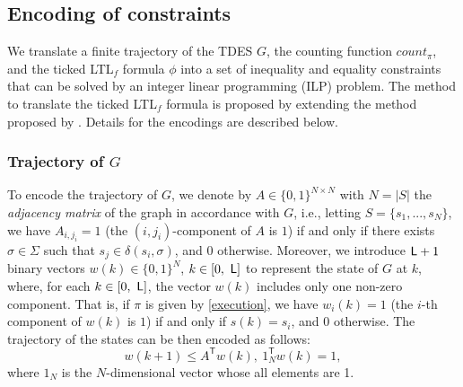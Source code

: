 \documentclass[journal,twoside,web]{IEEEtran}
\newcommand{\req}[1]{\eqref{#1}}
\newcommand{\Len}{{\sf L}}
\begin{document}
\subsection{Encoding of constraints}\label{encode}
%
We translate a finite trajectory of the TDES $G$, the counting function $count_\pi$, and the ticked LTL$_f$ formula $\phi$ into a set of inequality and equality constraints that can be solved by an integer linear programming (ILP) problem.
The method to translate the ticked LTL$_f$ formula is proposed by extending the method proposed by \cite{BHJLS2006}. Details for the encodings are described below. 
%
\subsubsection{Trajectory of $G$}
To encode the trajectory of $G$, we denote by $A \in \{0, 1\}^{N \times N}$ with $N=|S|$ the \textit{adjacency matrix} of the graph in accordance with $G$, i.e., letting $S = \{s_1, ..., s_{N}\}$, we have $A_{i,{j_i}} = 1$ (the $(i,{j_i})$-component of $A$ is $1$) if and only if there exists $\sigma \in \Sigma$ such that $s_j \in \delta(s_i, \sigma)$, and $0$ otherwise. Moreover, we introduce $\Len+1$ binary vectors $w (k) \in \{0, 1\}^{N}$, $k\in [0,\ \Len]$ to represent the state of $G$ at $k$, where, for each $k \in [0,\ \Len]$, the vector $w(k)$ includes only one non-zero component. That is, if $\pi$ is given by \req{execution}, we have $w_i (k) = 1$ (the $i$-th component of $w(k)$ is $1$) if and only if $s(k) = s_i$, and $0$ otherwise. The trajectory of the states can be then encoded as follows: 
\begin{equation}\label{w}
w(k+1) \leq A^\mathsf{T} w(k), \ {1}^\mathsf{T} _N w(k) =1, 
\end{equation}
where ${1}_N$ is the $N$-dimensional vector whose all elements are 1.
%
%
\end{document}
